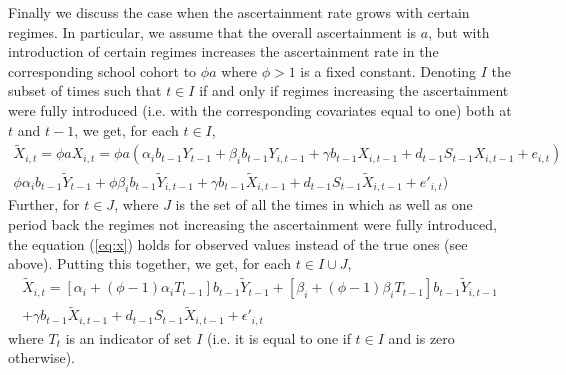 \documentclass[fleqn,10pt]{wlscirep}
\begin{document}
Finally we discuss the case when the ascertainment rate grows with certain regimes. In particular, we assume that the overall ascertainment is $a$, but with introduction of certain regimes increases the ascertainment rate in the corresponding school cohort to $\phi a$ where $\phi > 1$ is a fixed constant. Denoting $I$ the subset of times such that $t\in I$ if and only if regimes increasing the ascertainment were fully introduced (i.e. with the corresponding covariates equal to one) both at $t$ and $t-1$, we get, for each $t\in I$, 
\begin{multline*}
\tilde X_{i,t} = \phi a X_{i,t} = \phi a (\alpha_i b_{t-1} Y_{t-1} + \beta_i b_{t-1} Y_{i,t-1} + \gamma b_{t-1} X_{i,t-1}
+ d_{t-1} S_{t-1} X_{i,t-1} + e_{i,t}) \\
 \phi \alpha_i b_{t-1} \tilde Y_{t-1} + \phi \beta_i b_{t-1} \tilde Y_{i,t-1} + \gamma b_{t-1} \tilde X_{i,t-1}
+ d_{t-1} S_{t-1} \tilde X_{i,t-1} + e'_{i,t})
\end{multline*}
Further, for $t \in J$, where $J$ is the set of all the times in which as well as one period back the regimes not increasing the ascertainment were fully introduced, the equation (\ref{eq:x}) holds for observed values instead of the true ones (see above). Putting this together, we get, for each $t \in I \cup J$,  \begin{multline}
\tilde X_{i,t} 
=
[\alpha_i + (\phi-1)\alpha_i T_{t-1}]  b_{t-1} \tilde Y_{t-1} + [\beta_i + (\phi-1)\beta_i T_{t-1}] b_{t-1} \tilde Y_{i,t-1} \\ + 
 \gamma b_{t-1} \tilde X_{i,t-1}
+ d_{t-1} S_{t-1} \tilde X_{i,t-1} + \epsilon'_{i,t}
\label{eq:modx}
\end{multline}
where $T_t$ is an indicator of set $I$ (i.e. it is equal to one if $t\in I$ and is zero otherwise).
\end{document}
